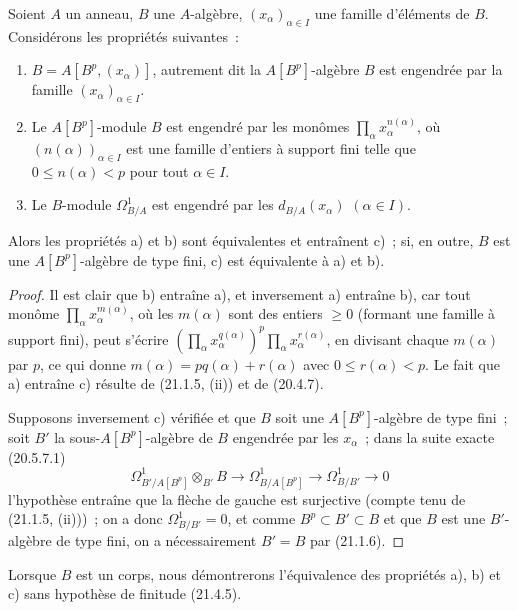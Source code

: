 \begin{proposition}[21.1.7]
\label{0.21.1.7-fr}
Soient $A$ un anneau, $B$ une $A$-algèbre, $(x_\alpha)_{\alpha\in I}$ une
famille d'éléments de $B$. Considérons les propriétés suivantes~:
\begin{enumerate}
  \item[a)] $B=A[B^p,(x_\alpha)]$, autrement dit la $A[B^p]$-algèbre
  $B$ est engendrée par la famille $(x_\alpha)_{\alpha\in I}$.
  \item[b)] Le $A[B^p]$-module $B$ est engendré par les monômes
  $\prod_\alpha x_\alpha^{n(\alpha)}$, où $(n(\alpha))_{\alpha\in I}$ est
  une famille d'entiers à support fini telle que $0\leq n(\alpha)<p$ pour
  tout $\alpha\in I$.
  \item[c)] Le $B$-module $\Omega^1_{B/A}$ est engendré par les
  $d_{B/A}(x_\alpha)$ $(\alpha\in I)$.
\end{enumerate}
Alors les propriétés a) et b) sont équivalentes et entraînent c)~; si, en
outre, $B$ est une $A[B^p]$-algèbre de type fini, c) est équivalente à a) et b).
\end{proposition}

\begin{proof}
Il est clair que b) entraîne a), et inversement a) entraîne b), car tout
monôme $\prod_\alpha x_\alpha^{m(\alpha)}$, où les $m(\alpha)$ sont des
entiers $\geq0$ (formant une famille à support fini), peut s'écrire
$(\prod_\alpha x_\alpha^{q(\alpha)})^p\prod_\alpha x_\alpha^{r(\alpha)}$,
en divisant chaque $m(\alpha)$ par $p$, ce qui donne
$m(\alpha)=p q(\alpha)+r(\alpha)$ avec $0\leq r(\alpha)<p$.
Le fait que a) entraîne c) résulte de (21.1.5, (ii)) et de (20.4.7).

Supposons inversement c) vérifiée et que $B$ soit une $A[B^p]$-algèbre de
type fini~; soit $B'$ la sous-$A[B^p]$-algèbre de $B$ engendrée par les
$x_\alpha$~; dans la suite exacte (20.5.7.1)
\[
\Omega^1_{B'/A[B^p]}\otimes_{B'}B\longrightarrow
\Omega^1_{B/A[B^p]}\longrightarrow\Omega^1_{B/B'}\longrightarrow0
\]
l'hypothèse entraîne que la flèche de gauche est surjective (compte tenu de
(21.1.5, (ii)))~; on a donc $\Omega^1_{B/B'}=0$, et comme
$B^p\subset B'\subset B$ et que $B$ est une $B'$-algèbre de type fini,
on a nécessairement $B'=B$ par (21.1.6).
\end{proof}

\begin{remark}[21.1.8]
\label{0.21.1.8-fr}
Lorsque $B$ est un corps, nous démontrerons l'équivalence des propriétés a),
b) et c) sans hypothèse de finitude (21.4.5).
\end{remark}


